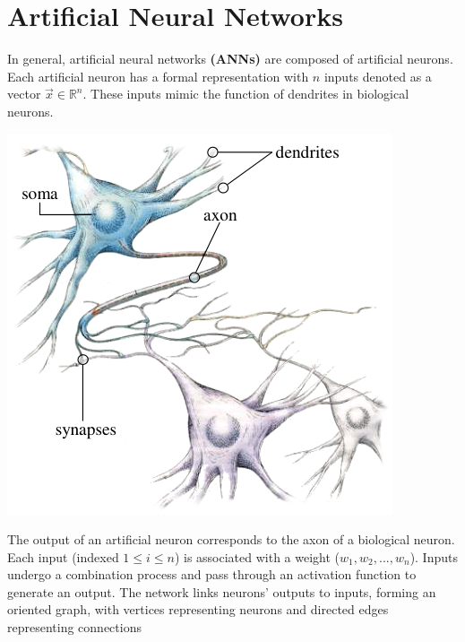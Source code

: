 \documentclass[a4paper]{report}
\begin{document}
\section{Artificial Neural Networks}
\normalsize{
In general, artificial neural networks \textbf{(ANNs)} are composed of artificial neurons. Each artificial neuron has a formal representation with $n$ inputs denoted as a vector $\vec{x}\in\mathbb{R}^n$. These inputs mimic the function of dendrites in biological neurons.
\begin{center}
\includegraphics[width=0.4\linewidth]{image.png}
\end{center}
The output of an artificial neuron corresponds to the axon of a biological neuron. Each input (indexed $1\leq i\leq n$) is associated with a weight (${w_1, w_2,...,w_n}$). Inputs undergo a combination process and pass through an activation function to generate an output. The network links neurons' outputs to inputs, forming an oriented graph, with vertices representing neurons and directed edges representing connections
\begin{figure}[H]
\begin{center}
\end{center}
\end{figure}}
\end{document}

